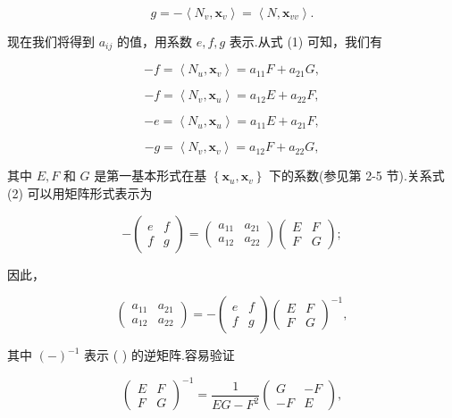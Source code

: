 \[
g =  - \left\langle  {{N}_{v},{\mathbf{x}}_{v}}\right\rangle   = \left\langle  {N,{\mathbf{x}}_{vv}}\right\rangle  .
\]

现在我们将得到 \({a}_{ij}\) 的值，用系数 \(e,f,g\) 表示.从式 (1) 可知，我们有

\[
- f = \left\langle  {{N}_{u},{\mathbf{x}}_{v}}\right\rangle   = {a}_{11}F + {a}_{21}G,
\]

\[
- f = \left\langle  {{N}_{v},{\mathbf{x}}_{u}}\right\rangle   = {a}_{12}E + {a}_{22}F, \tag{2}
\]

\[
- e = \left\langle  {{N}_{u},{\mathbf{x}}_{u}}\right\rangle   = {a}_{11}E + {a}_{21}F,
\]

\[
- g = \left\langle  {{N}_{v},{\mathbf{x}}_{v}}\right\rangle   = {a}_{12}F + {a}_{22}G,
\]

其中 \(E,F\) 和 \(G\) 是第一基本形式在基 \(\left\{  {{\mathbf{x}}_{u},{\mathbf{x}}_{v}}\right\}\) 下的系数(参见第 2-5 节).关系式 (2) 可以用矩阵形式表示为

\[
- \left( \begin{array}{ll} e & f \\  f & g \end{array}\right)  = \left( \begin{array}{ll} {a}_{11} & {a}_{21} \\  {a}_{12} & {a}_{22} \end{array}\right) \left( \begin{array}{ll} E & F \\  F & G \end{array}\right) ; \tag{3}
\]

因此，

\[
\left( \begin{array}{ll} {a}_{11} & {a}_{21} \\  {a}_{12} & {a}_{22} \end{array}\right)  =  - \left( \begin{array}{ll} e & f \\  f & g \end{array}\right) {\left( \begin{array}{ll} E & F \\  F & G \end{array}\right) }^{-1},
\]

其中 \({\left( -\right) }^{-1}\) 表示 ( ) 的逆矩阵.容易验证

\[
{\left( \begin{array}{ll} E & F \\  F & G \end{array}\right) }^{-1} = \frac{1}{{EG} - {F}^{2}}\left( \begin{matrix} G &  - F \\   - F & E \end{matrix}\right) ,
\]

